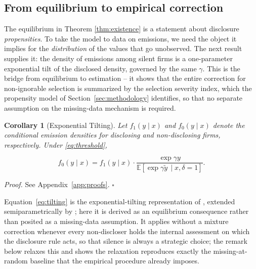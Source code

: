 \documentclass[a4paper,12pt]{article}
\newcommand{\citet}[1]{\textcite{#1}}
\newtheorem{corollary}[theorem]{Corollary}
\begin{document}
\subsection{From equilibrium to empirical correction}
\label{subsec:correction}

The equilibrium in Theorem \ref{thm:existence} is a statement about disclosure \emph{propensities}. To take the model to data on emissions, we need the object it implies for the \emph{distribution} of the values that go unobserved. The next result supplies it: the density of emissions among silent firms is a one-parameter exponential tilt of the disclosed density, governed by the same $\gamma$. This is the bridge from equilibrium to estimation -- it shows that the entire correction for non-ignorable selection is summarized by the selection severity index, which the propensity model of Section~\ref{sec:methodology} identifies, so that no separate assumption on the missing-data mechanism is required.

\begin{corollary}[Exponential Tilting] \label{cor:expo_tilt} Let $f_1(y \mid x)$ and $f_0(y \mid x)$ denote the conditional emission densities for disclosing and non-disclosing firms, respectively. Under \eqref{eq:threshold}, 

\begin{equation}
\label{eq:tilting}
    f_0(y \mid x) = f_1(y \mid x) \cdot \dfrac{\exp{\gamma y}}{\mathbb{E}[\exp{\gamma \tilde{y}} \, \mid x, \delta =1 ]}.
\end{equation}
\end{corollary}

\textit{Proof.} See Appendix~\ref{app:proofs}. \hfill $\square$

Equation~\eqref{eq:tilting} is the exponential-tilting representation of \citet{kim2011semiparametric}, extended semiparametrically by \citet{yang2017semiparametric}; here it is derived as an equilibrium consequence rather than posited as a missing-data assumption. It applies without a mixture correction whenever every non-discloser holds the internal assessment on which the disclosure rule acts, so that silence is always a strategic choice; the remark below relaxes this and shows the relaxation reproduces exactly the missing-at-random baseline that the empirical procedure already imposes.
\end{document}
